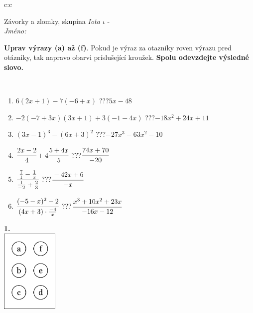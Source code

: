 \documentclass[10pt]{report}
\begin{document}
\begin{tabular}{c:c}
\begin{minipage}[c][104.5mm][t]{0.5\linewidth}
\begin{center}
\vspace{7mm}
{\huge Závorky a zlomky, skupina \textit{Iota $\iota$} -}\\[5mm]
\textit{Jméno:}\phantom{xxxxxxxxxxxxxxxxxxxxxxxxxxxxxxxxxxxxxxxxxxxxxxxxxxxxxxxxxxxxxxxxx}\\[5mm]
\begin{minipage}{0.95\linewidth}
\begin{center}
\textbf{Uprav výrazy (a) až (f)}. Pokud je výraz za otazníky roven výrazu pred otázniky, tak napravo obarvi príslušející kroužek. \textbf{Spolu odevzdejte výsledné slovo.}
\end{center}
\end{minipage}
\\[1mm]
\begin{minipage}{0.79\linewidth}
\begin{center}
\begin{varwidth}{\linewidth}
\begin{enumerate}
\normalsize
\item $6(2x+1)-7(-6+x)$\quad \dotfill\; ???\;\dotfill \quad $5x-48$
\item $-2(-7+3x)(3x+1)+3(-1-4x)$\quad \dotfill\; ???\;\dotfill \quad $-18x^2+24x+11$
\item $(3x-1)^3-(6x+3)^2$\quad \dotfill\; ???\;\dotfill \quad $-27x^3-63x^2-10$
\item $\cfrac{2x-2}{4}+4\cfrac{5+4x}{5}$\quad \dotfill\; ???\;\dotfill \quad $\cfrac{74x+70}{-20}$
\item $\cfrac{\frac{7}{1}-\frac{1}{x}}{\frac{1}{-2}+\frac{2}{3}}$\quad \dotfill\; ???\;\dotfill \quad $\cfrac{-42x+6}{-x}$
\item $\cfrac{(-5-x)^2-2}{(4x+3)\cdot\frac{-4}{x}}$\quad \dotfill\; ???\;\dotfill \quad $\cfrac{x^3+10x^2+23x}{-16x-12}$
\end{enumerate}
\end{varwidth}
\end{center}
\end{minipage}
\begin{minipage}{0.20\linewidth}
\begin{center}
{\Huge\bfseries 1.} \\[2mm]
\includegraphics[height=40mm]{../images/braille.png}

\end{center}
\end{minipage}
\end{center}
\end{minipage}
\end{tabular}
\end{document}
